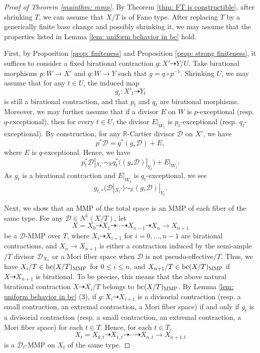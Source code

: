 \documentclass[11pt,oneside,reqno]{amsart}
\numberwithin{equation}{section}
\theoremstyle{definition}
\newcommand{\bc}{{\rm {bc}}}
\newcommand{\dto}{\dashrightarrow}
\newcommand{\bR}{\mathbb{R}}
\newcommand{\mD}{\mathcal{D}}
\begin{document}
 
 
 
\begin{proof}[Proof of Theorem \ref{mainthm: mmp}]
By Theorem \ref{thm: FT is constructible}, after shrinking $T$, we can assume that $X/T$ is of Fano type. After replacing $T$ by a generically finite base change and possibly shrinking it, we may assume that the properties listed in Lemma \ref{lem: uniform behavior in bc} hold.

First, by Proposition \ref{prop: finiteness} and Proposition \ref{prop: strong finiteness}, it suffices to consider a fixed birational contraction $g: X' \dto Y/U$. Take birational morphisms $p\colon W \to X'$ and $q\colon W \to Y$ such that $g = q \circ p^{-1}$. Shrinking $U$, we may assume that for any $t \in U$, the induced map
\[
g_t \colon X'_t \dashrightarrow Y_t
\]
is still a birational contraction, and that $p_t$ and $q_t$ are birational morphisms. Moreover, we may further assume that if a divisor $E$ on $W$ is $p$-exceptional (resp. $q$-exceptional), then for every $t \in U$, the divisor $E|_{W_t}$ is $p_t$-exceptional (resp. $q_t$-exceptional). 
By construction, for any $\bR$-Cartier divisor $\mD$ on $X'$, we have 
\[
p^*\mD = q^*(g_*\mD) +E,
\] where $E$ is $q$-exceptional. Hence, we have
\[
p_t^*\mD|_{X_t'} \sim_\bR q_t^*((g_*\mD)|_{Y_t}) + E|_{W_t}.
\] As $g_t$ is a birational contraction and $E|_{W_t}$ is $q_t$-exceptional, we see 
\[
g_{t,*}(\mD|_{X_t'}) \sim_\bR (g_*\mD)|_{Y_t}.
\] 

Next, we show that an MMP of the total space is an MMP of each fiber of the same type. For any $\mD \in N^1(X/T)$, let 
\[
X=X_0 \dasharrow X_1 \dasharrow \cdots \dto X_{n-1}\dasharrow X_n \to X_{n+1}
\] be a $\mD$-MMP over $T$,  where $X_i \dasharrow X_{i+1}$ for $i=0, \ldots, n-1$ are birational contractions, and $X_n \to X_{n+1}$ is either a contraction induced by the semi-ample$/T$ divisor $\mD_{X_{n}}$ or a Mori fiber space when $\mD$ is not pseudo-effective$/T$. Thus,  we have $X_i/T \in \bc(X/T)_{\rm MMP}$ for $0 \leq i \leq n$, and $X_{n+1}/T\in \bc(X/T)_{\rm MMP}$ if $X \dasharrow X_{n+1}$ is birational. To be precise, this means that the above natural birational contraction $X \dasharrow X_i/T$ belongs to $\bc(X/T)_{\rm MMP}$. By Lemma \ref{lem: uniform behavior in bc} (3), if $g: X_i \dasharrow X_{i+1}$ 
is a divisorial contraction (resp. a small contraction, an extremal contraction, a Mori fiber space) if and only if $g_t$ 
is a divisorial contraction (resp. a small contraction, an extremal contraction, a Mori fiber space) for each $t\in T$. Hence, for each $t\in T$,
\[
X_t=X_{0,t} \dasharrow X_{1,t} \dasharrow \cdots \dasharrow X_{n,t} \to X_{n+1, t}
\] is a $\mD_t$-MMP on $X_t$ of the same type. 


\end{proof}
\end{document}
